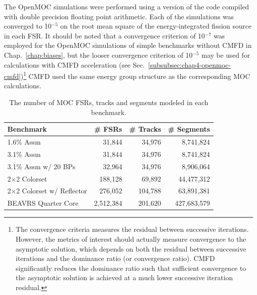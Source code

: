 The OpenMOC simulations were performed using a version of the code compiled with double precision floating point arithmetic. Each of the simulations was converged to 10$^{-5}$ on the root mean square of the energy-integrated fission source in each \ac{FSR}. It should be noted that a convergence criterion of 10$^{-7}$ was employed for the OpenMOC simulations of simple benchmarks without \ac{CMFD} in Chap.~\ref{chap:biases}, but the looser convergence criterion of 10$^{-5}$ may be used for calculations with \ac{CMFD} acceleration (see Sec.~\ref{subsubsec:chap4-openmoc-cmfd})\footnote{The convergence criteria measures the residual between successive iterations. However, the metrics of interest should actually measure convergence to the asymptotic solution, which depends on both the residual between successive iterations and the dominance ratio (or convergence ratio). \ac{CMFD} significantly reduces the dominance ratio such that sufficient convergence to the asymptotic solution is achieved at a much lower successive iteration residual.} \ac{CMFD} used the same energy group structure as the corresponding \ac{MOC} calculations.

\begin{table}[h!]
  \centering
  \caption[Number of \ac{FSR}s, tracks and segments for each heterogeneous benchmark]{The number of \ac{MOC} \ac{FSR}s, tracks and segments modeled in each benchmark.}
  \small
  \label{table:chap8-num-fsrs-tracks-segments}
  \vspace{6pt}
  \begin{tabular}{l r r r}
  \toprule
  \rowcolor{lightgray}
  \textbf{Benchmark} &
  \multicolumn{1}{c}{\cellcolor{lightgray} \textbf{\# \ac{FSR}s}} &
  \multicolumn{1}{c}{\cellcolor{lightgray} \textbf{\# Tracks}} &
  \multicolumn{1}{c}{\cellcolor{lightgray} \textbf{\# Segments}} \\
  \midrule
1.6\% Assm & 31,844 & 34,976 & 8,741,824 \\
  \midrule
3.1\% Assm & 31,844 & 34,976 & 8,741,824 \\
  \midrule
3.1\% Assm w/ 20 BPs & 32,964 & 34,976 & 8,906,064  \\
  \midrule
2$\times$2 Colorset & 188,128 & 69,892 & 44,477,312 \\
  \midrule
2$\times$2 Colorset w/ Reflector & 276,052 & 104,788 & 63,891,381 \\
  \midrule
\ac{BEAVRS} Quarter Core & 2,512,384 & 201,620 & 427,683,579 \\
  \bottomrule
\end{tabular}
\end{table}

